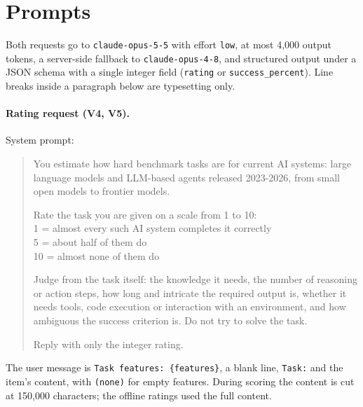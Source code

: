\section{Prompts}\label{app:prompt}

Both requests go to \texttt{claude-opus-5-5} with effort \texttt{low}, at most 4,000 output tokens, a server-side fallback to \texttt{claude-opus-4-8}, and structured output under a JSON schema with a single integer field (\texttt{rating} or \texttt{success\_percent}). Line breaks inside a paragraph below are typesetting only.

\paragraph{Rating request (V4, V5).} System prompt:
\begin{quote}\small
You estimate how hard benchmark tasks are for current AI systems: large language models and LLM-based agents released 2023-2026, from small open models to frontier models.

Rate the task you are given on a scale from 1 to 10:\\
1 = almost every such AI system completes it correctly\\
5 = about half of them do\\
10 = almost none of them do

Judge from the task itself: the knowledge it needs, the number of reasoning or action steps, how long and intricate the required output is, whether it needs tools, code execution or interaction with an environment, and how ambiguous the success criterion is. Do not try to solve the task.

Reply with only the integer rating.
\end{quote}
The user message is \texttt{Task features: \{features\}}, a blank line, \texttt{Task:} and the item's content, with \texttt{(none)} for empty features. During scoring the content is cut at 150,000 characters; the offline ratings used the full content.

